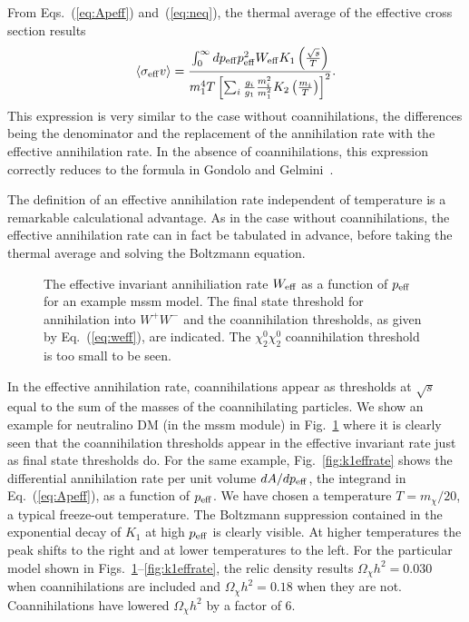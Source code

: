 \documentclass[a4paper,10pt,oneside]{book}
\newcommand{\code}[1]{\ft{#1}}
\newcommand{\ft}[1]{\textsf{#1}}
\begin{document}
{}From Eqs.~(\ref{eq:Apeff}) and~(\ref{eq:neq}), the thermal average of
the effective cross section results
\begin{equation} \label{eq:sigmavefffin2}
  \langle \sigma_{\rm{eff}}v \rangle = \frac{\int_0^\infty
  dp_{\rm{eff}} p_{\rm{eff}}^2 W_{\rm{eff}} K_1 \left(
  \frac{\sqrt{s}}{T} \right) } { m_1^4 T \left[ \sum_i \frac{g_i}{g_1}
  \frac{m_i^2}{m_1^2} K_2 \left(\frac{m_i}{T}\right) \right]^2}.
\end{equation}
This expression is very similar to the case without coannihilations,
the differences being the denominator and the replacement of the
annihilation rate with the effective annihilation rate. 
In the absence of coannihilations, this expression
correctly reduces to the formula in Gondolo and
Gelmini~\cite{Gondolo:1990dk}.

The definition of an effective annihilation rate independent of
temperature is a remarkable calculational advantage. As in the case
without coannihilations, the effective annihilation rate can in fact
be tabulated in advance, before taking the thermal average and
solving the Boltzmann equation.

\begin{figure}
  \centerline{}
  \caption{The effective invariant annihiliation rate $W_{\rm eff}$
    as a function of $p_{\rm eff}$ for an example \code{mssm} model. 
    The final state threshold for
    annihilation into $W^+ W^-$ and the coannihilation thresholds, as
    given by Eq.~(\protect\ref{eq:weff}), are indicated.  
    The $\chi_2^0 \chi_2^0$ coannihilation threshold is too small to
    be seen.}
  \label{fig:effrate}
\end{figure}

In the effective annihilation rate, coannihilations appear
as thresholds at $\sqrt{s}$ equal to the sum of the masses of the
coannihilating particles.  We show an example for neutralino
DM (in the \code{mssm} module) in
Fig.~\ref{fig:effrate} where it is clearly seen that the
coannihilation thresholds appear in the effective invariant rate
just as final state thresholds do.  For the same example,
Fig.~\ref{fig:k1effrate} shows the differential annihilation rate
per unit volume $dA/dp_{\rm eff}$, the integrand in
Eq.~(\ref{eq:Apeff}), as a function of $p_{\rm eff}$. We have
chosen a temperature $T=m_{\chi}/20$, a typical freeze-out
temperature. The Boltzmann suppression contained in the exponential
decay of $K_{1}$ at high $p_{\rm eff}$ is clearly visible.  At
higher temperatures the peak shifts to the right and at lower
temperatures to the left.  For the particular model shown in
Figs.~\ref{fig:effrate}--\ref{fig:k1effrate}, the relic density
results $\Omega_\chi h^2=0.030$ when coannihilations are included
and $\Omega_\chi h^2=0.18$ when they are not. Coannihilations
have lowered $\Omega_\chi h^2$ by a factor of 6.
\end{document}
